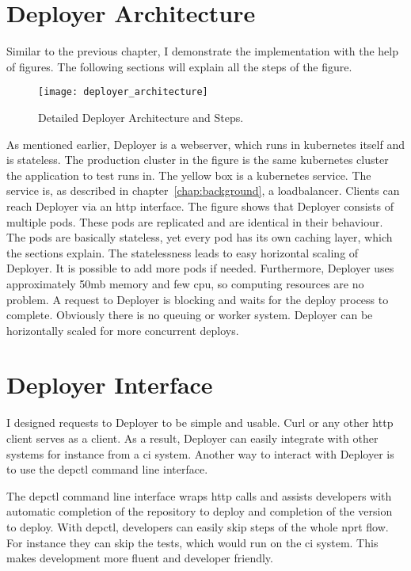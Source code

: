 \section{Deployer Architecture}

Similar to the previous chapter, I demonstrate the implementation with the help of
figures. The following sections will explain all the steps of the figure.

\begin{figure}[htbp]
  \centering
  \texttt{[image: deployer\_architecture]}
  \caption[nprtflow]{Detailed Deployer Architecture and Steps.}
  \label{fig:deployer_architecture}
\end{figure}

As mentioned earlier, Deployer is a webserver, which runs in kubernetes itself and is
stateless. The production cluster in the figure is the same kubernetes cluster the
application to test runs in. The yellow box is a kubernetes service. The service is, as
described in chapter~\ref{chap:background}, a loadbalancer. Clients can reach Deployer via
an http interface. The figure shows that Deployer consists of multiple pods. These pods
are replicated and are identical in their behaviour. The pods are basically stateless, yet
every pod has its own caching layer, which the sections explain. The statelessness leads
to easy horizontal scaling of Deployer. It is possible to add more pods if
needed. Furthermore, Deployer uses approximately 50mb memory and few cpu, so computing
resources are no problem. A request to Deployer is blocking and waits for the deploy
process to complete. Obviously there is no queuing or worker system. Deployer can be
horizontally scaled for more concurrent deploys.


\section{Deployer Interface}
\label{sec:interface}

I designed requests to Deployer to be simple and usable. Curl or any other http client
serves as a client. As a result, Deployer can easily integrate with other systems for
instance from a \gls{ci} system. Another way to interact with Deployer is to use the
depctl command line interface.

The depctl command line interface wraps http calls and assists developers with automatic
completion of the repository to deploy and completion of the version to deploy. With
depctl, developers can easily skip steps of the whole \gls{nprt} flow. For instance they
can skip the tests, which would run on the \gls{ci} system. This makes development more
fluent and developer friendly.

